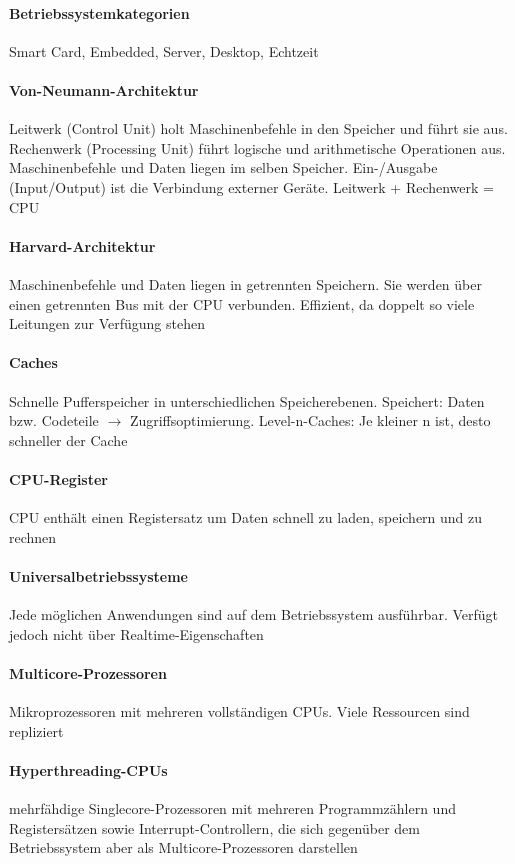 \documentclass[10pt,a4paper,landscape]{article}
\begin{document}
\begin{multicols*}{3}
	\paragraph{Betriebssystemkategorien} Smart Card, Embedded, Server, Desktop, Echtzeit
	\paragraph{Von-Neumann-Architektur} Leitwerk (Control Unit) holt Maschinenbefehle in den Speicher und führt sie aus. Rechenwerk (Processing Unit) führt logische und arithmetische Operationen aus. Maschinenbefehle und Daten liegen im selben Speicher. Ein-/Ausgabe (Input/Output) ist die Verbindung externer Geräte. Leitwerk + Rechenwerk = CPU
	
	\paragraph{Harvard-Architektur} Maschinenbefehle und Daten liegen in getrennten Speichern. Sie werden über einen getrennten Bus mit der CPU verbunden. Effizient, da doppelt so viele Leitungen zur Verfügung stehen
	\paragraph{Caches} Schnelle Pufferspeicher in unterschiedlichen Speicherebenen. Speichert: Daten bzw. Codeteile $\rightarrow$ Zugriffsoptimierung. Level-n-Caches: Je kleiner n ist, desto schneller der Cache
	\paragraph{CPU-Register} CPU enthält einen Registersatz um Daten schnell zu laden, speichern und zu rechnen
	\paragraph{Universalbetriebssysteme} Jede möglichen Anwendungen sind auf dem Betriebssystem ausführbar. Verfügt jedoch nicht über Realtime-Eigenschaften
	\paragraph{Multicore-Prozessoren} Mikroprozessoren mit mehreren vollständigen CPUs. Viele Ressourcen sind repliziert
	\paragraph{Hyperthreading-CPUs} mehrfähdige Singlecore-Prozessoren mit mehreren Programmzählern und Registersätzen sowie Interrupt-Controllern, die sich gegenüber dem Betriebssystem aber als Multicore-Prozessoren darstellen

\end{multicols*}
\end{document}
